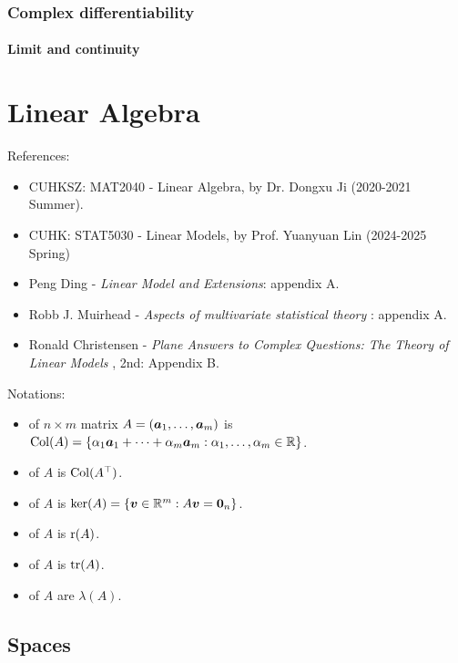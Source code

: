 \documentclass[10pt,a4paper]{book}
\begin{document}
\subsection{Complex differentiability}\label{sec:complex-diff}
\subsubsection{Limit and continuity}

\chapter{Linear Algebra}\label{chap:linear_algebra}
References: 
\begin{itemize}
	\item CUHKSZ: MAT2040 - Linear Algebra, by Dr. Dongxu Ji (2020-2021 Summer).
	\item CUHK: STAT5030 - Linear Models, by Prof. Yuanyuan Lin (2024-2025 Spring)
	\item Peng Ding - \textit{Linear Model and Extensions}: appendix A.
	\item Robb J. Muirhead - \textit{Aspects of multivariate statistical theory} \cite{muirhead1982aspects}: appendix A.
	\item Ronald Christensen - \textit{Plane Answers to
	Complex Questions: The Theory of Linear Models} \cite{christensen2002plane}, 2nd: Appendix B.
\end{itemize}

\noindent Notations:  
\begin{itemize}
	\item {} of $n\times m$ matrix $A=({\boldsymbol a}_1,\ldots,{\boldsymbol a}_m)$ is $\mathrm{Col}(A)=\{\alpha_{1}{\boldsymbol a}_{1}+\cdots+\alpha_{m}{\boldsymbol a}_{m}:\alpha_{1},\ldots,\alpha_{m}\in\mathbb R\}$.
	\item {} of $A$ is $\mathrm{Col}(A^\top)$.
	\item {} of $A$ is $\ker(A)=\{{\boldsymbol v}\in\mathbb R^{m}:A{\boldsymbol v}={\boldsymbol 0}_n\}$.  
	\item {} of $A$ is $\mathrm{r}(A)$.  
	\item {} of $A$ is $\mathrm{tr}(A)$.  
	\item {} of $A$ are $\lambda(A)$.  
\end{itemize}

\section{Spaces}\label{sec:mat_space}
\end{document}
